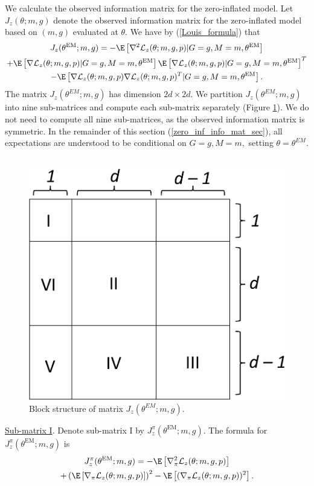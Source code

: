 \documentclass[12pt]{article}
\begin{document}
We calculate the observed information matrix for the zero-inflated model. Let $J_z(\theta; m, g)$ denote the observed information matrix for the zero-inflated model based on $(m,g)$ evaluated at $\theta$. We have by (\ref{Louis_formula}) that
\begin{multline}\label{zero_inf_info_mat}
J_z(\theta^\textrm{EM}; m, g) = -\E \left[\nabla^2 \mathcal{L}_z(\theta; m, g, p) | G = g, M = m, \theta^\textrm{EM} \right] \\ + \E\left[ \nabla \mathcal{L}_z(\theta; m, g, p) | G = g, M = m, \theta^\textrm{EM} \right] \E\left[ \nabla \mathcal{L}_z(\theta; m, g, p) | G = g, M = m, \theta^\textrm{EM} \right]^T \\ - \E\left[ \nabla\mathcal{L}_z(\theta; m, g, p) \nabla \mathcal{L}_z(\theta; m, g, p)^T | G = g, M = m, \theta^\textrm{EM} \right].
\end{multline}
The matrix $J_z(\theta^{EM}; m, g)$ has dimension $2d \times 2d$. We partition $J_z(\theta^{EM}; m, g)$ into nine sub-matrices and compute each sub-matrix separately (Figure \ref{fig2crop}). We do not need to compute all nine sub-matrices, as the observed information matrix is symmetric. In the remainder of this section (\ref{zero_inf_info_mat_sec}), all expectations are understood to be conditional on $G = g, M = m,$ setting $\theta = \theta^{EM}$.  \\ \\
\begin{figure}
	\centering
	\includegraphics[width=0.6\linewidth]{fig2_crop}
	\caption{Block structure of matrix $J_z(\theta^{EM}; m, g)$.}
	\label{fig2crop}
\end{figure}
\noindent
\underline{Sub-matrix I}. Denote sub-matrix I by $J_z^{\pi}(\theta^{\textrm{EM}}; m, g).$ The formula for $J_z^{\pi}(\theta^{\textrm{EM}}; m, g)$ is 
\begin{multline}\label{sub_mat_1}
J^{\pi}_z(\theta^{\textrm{EM}}; m,g) = -\E \left[\nabla^2_\pi \mathcal{L}_z(\theta; m, g, p) \right] \\ + \left(\E\left[ \nabla_\pi \mathcal{L}_z(\theta; m, g, p) \right] \right)^2 - \E\left[ ( \nabla_\pi \mathcal{L}_z(\theta; m, g, p))^2 \right].
\end{multline}
\end{document}
